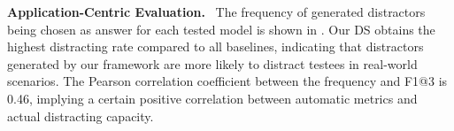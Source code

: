 \noindent
\textbf{Application-Centric Evaluation.} ~The frequency of generated distractors being chosen as answer for each tested model is shown in . Our DS obtains the highest distracting rate compared to all baselines, indicating that distractors generated by our framework are more likely to distract testees in real-world scenarios. The Pearson correlation coefficient between the frequency and F1@3 is 0.46, implying a certain positive correlation between automatic metrics and actual distracting capacity.






